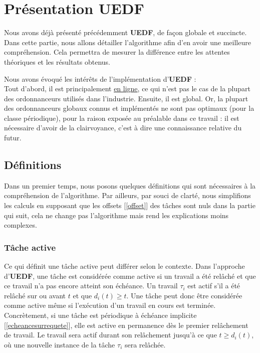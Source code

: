 	
	\section{Présentation UEDF}
	
	Nous avons déjà présenté précédemment \textbf{UEDF}, de façon globale et succincte. 
	Dans cette partie, nous allons détailler l'algorithme afin d'en avoir une meilleure compréhension. Cela 
	permettra de mesurer la différence entre les attentes théoriques et les résultats obtenus.\newline

	Nous avons évoqué les intérêts de l'implémentation d'\textbf{UEDF} :\\
	Tout d'abord, il est principalement \hyperref[inline]{en ligne}, ce qui n'est pas le cas de 
	la plupart des ordonnanceurs utilisés dans l'industrie.
	Ensuite, il est global. Or, la plupart des ordonnanceurs 
	globaux connus et implémentés ne sont pas optimaux (pour la classe périodique), pour la
	raison exposée au préalable dans ce travail : il est nécessaire d'avoir de la clairvoyance, 
	c'est à dire une connaissance relative du futur.\newline
	
	
	\subsection{Définitions}
	Dans un premier temps, nous posons quelques définitions qui sont nécessaires à la compréhension de l'algorithme. 
	Par ailleurs, par souci de clarté, nous simplifions les calculs en supposant que les offsets [\ref*{offset}] des tâches 
	sont nuls dans la partie qui suit, cela ne change pas l'algorithme mais rend les explications moins 
	complexes.\\
	\subsubsection{Tâche active}\label{tacheactive}
	Ce qui définit une tâche \og{}active\fg{} peut différer selon le contexte. Dans l'approche d'\textbf{UEDF}, une tâche est 
	considérée comme active si un travail a été relâché et que ce travail n'a pas encore atteint son échéance. 
	Un travail $\tau_i$ est actif s'il a été relâché sur ou avant $t$ et que $d_i(t) \geq t$.
	Une tâche peut donc 
	être considérée comme active même si l'exécution d'un travail en cours est terminée. 
	Concrètement, si une tâche est périodique à échéance implicite [\hyperref[echeancesurrequete]{\ref*{echeancesurrequete}}], elle est active en permanence dès le 
	premier relâchement de travail. Le travail sera actif durant son relâchement jusqu'à ce que $t \geq d_i(t)$, où 
	une nouvelle instance de la tâche $\tau_i$ sera relâchée.
	
